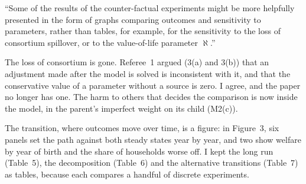 \documentclass[11pt]{article}
\begin{document}
\begin{referee}
``Some of the results of the counter-factual experiments might be more helpfully
presented in the form of graphs comparing outcomes and sensitivity to parameters,
rather than tables, for example, for the sensitivity to the loss of consortium
spillover, or to the value-of-life parameter $\aleph$.''
\end{referee}
\begin{response}
The loss of consortium is gone. Referee~1 argued (3(a) and 3(b)) that an adjustment
made after the model is solved is inconsistent with it, and that the conservative
value of a parameter without a source is zero. I agree, and the paper no longer has
one. The harm to others that decides the comparison is now inside the model, in the
parent's imperfect weight on its child (M2(c)).

The transition, where outcomes move over time, is a figure: in Figure~3, six panels
set the path against both steady states year by year, and two show welfare by year of
birth and the share of households worse off. I kept the long run (Table~5), the
decomposition (Table~6) and the alternative transitions (Table~7) as tables, because
each compares a handful of discrete experiments.


\end{response}
\end{document}
